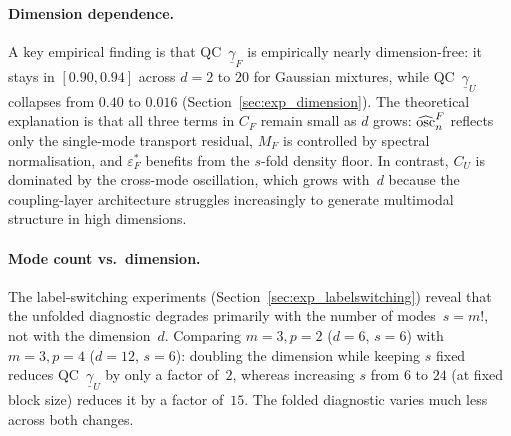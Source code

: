\paragraph{Dimension dependence.}
A key empirical finding is that
QC~$\underline{\gamma}_F$ is empirically nearly dimension-free:
it stays in $[0.90, 0.94]$ across $d = 2$ to $20$ for Gaussian
mixtures, while QC~$\underline{\gamma}_U$ collapses from $0.40$
to $0.016$ (Section~\ref{sec:exp_dimension}).  The theoretical
explanation is that all three terms in $C_F$ remain small as $d$
grows: $\widehat{\mathrm{osc}}_n^F$ reflects only the single-mode
transport residual, $M_F$ is controlled by spectral normalisation,
and $\varepsilon_F^*$ benefits from the $s$-fold density floor.
In contrast, $C_U$ is dominated by the cross-mode oscillation,
which grows with~$d$ because the coupling-layer architecture
struggles increasingly to generate multimodal structure in high
dimensions.

\paragraph{Mode count vs.\ dimension.}
The label-switching experiments (Section~\ref{sec:exp_labelswitching})
reveal that the unfolded diagnostic degrades primarily with the
number of modes~$s = m!$, not with the dimension~$d$.
Comparing $m = 3, p = 2$ ($d = 6$, $s = 6$) with $m = 3, p = 4$
($d = 12$, $s = 6$): doubling the dimension while keeping $s$
fixed reduces QC~$\underline{\gamma}_U$ by only a factor of~$2$,
whereas increasing $s$ from $6$ to $24$ (at fixed block size)
reduces it by a factor of~$15$.  The folded diagnostic varies
much less across both changes.
